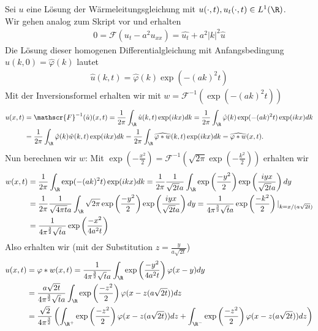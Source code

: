 \begin{solution}

Sei $u$ eine Lösung der Wärmeleitungsgleichung mit $u(\cdot,t), u_t(\cdot,t) \in L^1(\R)$. \\
Wir gehen analog zum Skript vor und erhalten
\begin{align*}
0 = \mathscr{F}(u_t - a^2u_{xx}) = \hat{u_t} + a^2|k|^2\hat{u}
\end{align*}
Die Lösung dieser homogenen Differentialgleichung mit Anfangsbedingung $\hat{u}(k,0) = \hat{\varphi}(k)$ lautet
\begin{align*}
  \hat{u}(k,t) = \hat{\varphi}(k)\exp(-(ak)^2t)
\end{align*}
Mit der Inversionsformel erhalten wir mit $w = \mathscr{F}^{-1}(\exp(-(ak)^2t))$
\begin{align*}
  u(x,t) &= \mathscr{F}^{-1}(\hat{u})(x,t) = \frac{1}{2\pi}\int_\R \hat{u}(k,t)\exp(ikx)dk
  = \frac{1}{2\pi}\int_\R \hat{\varphi}(k)\exp(-(ak)^2t)\exp(ikx)dk \\
  &= \frac{1}{2\pi}\int_\R \hat{\varphi}(k)\hat{w}(k,t)\exp(ikx)dk
  = \frac{1}{2\pi}\int_\R \widehat{\varphi \ast w}(k,t)\exp(ikx)dk
  = \widehat{\varphi \ast w}(x,t).
\end{align*}
Nun berechnen wir $w$: Mit
$\exp(-\frac{x^2}{2}) = \mathscr{F}^{-1}\left(\sqrt{2\pi}\exp\left(-\frac{k^2}{2}\right)\right)$
erhalten wir
\begin{align*}
  w(x,t) &= \frac{1}{2\pi}\int_\R \exp(-(ak)^2t)\exp(ikx) dk
  = \frac{1}{2\pi}\frac{1}{\sqrt{2t}a}\int_\R \exp\left(\frac{-y^2}{2}\right)
  \exp\left(\frac{iyx}{\sqrt{2t}a}\right) dy \\
  &= \frac{1}{2\pi}\frac{1}{\sqrt{4\pi t}a}\int_\R \sqrt{2\pi}\exp\left(\frac{-y^2}{2}\right)
  \exp\left(\frac{iyx}{\sqrt{2t}a}\right) dy
  = \frac{1}{4 \pi^{\frac{3}{2}} \sqrt{t}a}\exp\left(\frac{-k^2}{2}\right)|_{k = x/(a \sqrt{2t})} \\
  &= \frac{1}{4 \pi^{\frac{3}{2}} \sqrt{t}a}\exp\left(\frac{-x^2}{4a^2 t}\right)
\end{align*}
Also erhalten wir (mit der Substitution $z = \frac{y}{a \sqrt{2t}}$)
\begin{align*}
  u(x,t) &= \varphi \ast w (x,t) =
  \frac{1}{4 \pi^{\frac{3}{2}} \sqrt{t}a} \int_\R \exp\left(\frac{-y^2}{4a^2 t}\right)\varphi(x-y) dy \\
  &= \frac{a \sqrt{2t}}{4 \pi^{\frac{3}{2}} \sqrt{t}a} \int_\R \exp\left(\frac{-z^2}{2}\right)\varphi(x-z(a \sqrt{2t})) dz \\
  &= \frac{\sqrt{2}}{4 \pi^{\frac{3}{2}}} \left(\int_{\R^{+}} \exp\left(\frac{-z^2}{2}\right)\varphi(x-z(a \sqrt{2t})) dz + \int_{\R^{-}} \exp\left(\frac{-z^2}{2}\right)\varphi(x-z(a \sqrt{2t})) dz \right)

\end{align*}
\end{solution}
